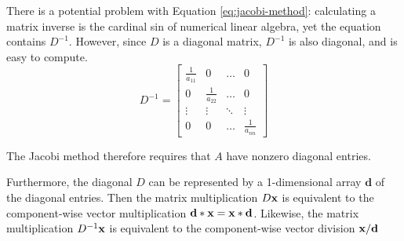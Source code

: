 There is a potential problem with Equation \ref{eq:jacobi-method}: calculating a matrix inverse is the cardinal sin of numerical linear algebra, yet the equation contains $D^{-1}$.
However, since $D$ is a diagonal matrix, $D^{-1}$ is also diagonal, and is easy to compute.
\[
D^{-1} =
\left[\begin{array}{cccc}
    \frac{1}{a_{11}} & 0                & \ldots & 0      \\
    0                & \frac{1}{a_{22}} & \ldots & 0      \\
    \vdots           & \vdots           & \ddots & \vdots \\
    0                & 0                & \ldots & \frac{1}{a_{nn}}
\end{array}\right]
\]

The Jacobi method therefore requires that $A$ have nonzero diagonal entries.

Furthermore, the diagonal $D$ can be represented by a 1-dimensional array $\mathbf{d}$ of the diagonal entries.
Then the matrix multiplication $D\mathbf{x}$ is equivalent to the component-wise vector multiplication $\mathbf{d}*\mathbf{x} = \mathbf{x}*\mathbf{d}$.
Likewise, the matrix multiplication $D^{-1}\mathbf{x}$ is equivalent to the component-wise vector division $\mathbf{x}/\mathbf{d}$

